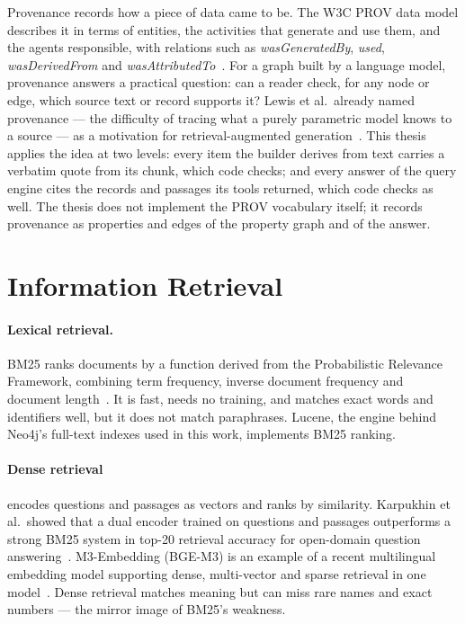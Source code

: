 Provenance records how a piece of data came to be. The W3C PROV data model describes it in terms of entities,
the activities that generate and use them, and the agents responsible, with relations such as
\emph{wasGeneratedBy}, \emph{used}, \emph{wasDerivedFrom} and \emph{wasAttributedTo}~\cite{moreau2013provdm}.
For a graph built by a language model, provenance answers a practical question: can a reader check, for any
node or edge, which source text or record supports it? Lewis et al.\ already named provenance --- the
difficulty of tracing what a purely parametric model knows to a source --- as a motivation for
retrieval-augmented generation~\cite{lewis2020retrieval}. This thesis applies the idea at two levels: every
item the builder derives from text carries a verbatim quote from its chunk, which code checks; and every answer
of the query engine cites the records and passages its tools returned, which code checks as well. The thesis
does not implement the PROV vocabulary itself; it records provenance as properties and edges of the property
graph and of the answer.

\section{Information Retrieval}\label{sec:ch02-information-retrieval}

\paragraph{Lexical retrieval.} BM25 ranks documents by a function derived from the Probabilistic Relevance
Framework, combining term frequency, inverse document frequency and document length~\cite{robertson2009probabilistic}.
It is fast, needs no training, and matches exact words and identifiers well, but it does not match
paraphrases. Lucene, the engine behind Neo4j's full-text indexes used in this work, implements BM25 ranking.

\paragraph{Dense retrieval} encodes questions and passages as vectors and ranks by similarity. Karpukhin et
al.\ showed that a dual encoder trained on questions and passages outperforms a strong BM25 system in top-20
retrieval accuracy for open-domain question answering~\cite{karpukhin2020dense}. M3-Embedding (BGE-M3) is an
example of a recent multilingual embedding model supporting dense, multi-vector and sparse retrieval in one
model~\cite{chen2024m3}. Dense retrieval matches meaning but can miss rare names and exact numbers --- the
mirror image of BM25's weakness.

